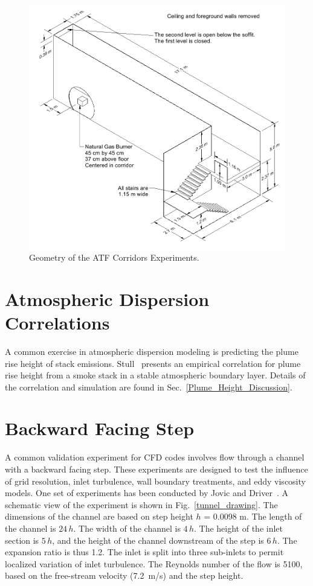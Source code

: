 \begin{figure}[p]
\includegraphics[width=\textwidth]{FIGURES/ATF_Corridors/ATF_Corridors_Drawing}
\caption{Geometry of the ATF Corridors Experiments.}
\label{ATF Drawing}
\end{figure}


\section{Atmospheric Dispersion Correlations}
\label{Atmospheric_Dispersion_Description}

A common exercise in atmospheric dispersion modeling is predicting the plume rise height of stack emissions. Stull~\cite{Stull:2000} presents an empirical correlation for plume rise height from a smoke stack in a stable atmospheric boundary layer. Details of the correlation and simulation are found in Sec.~\ref{Plume_Height_Discussion}.



\section{Backward Facing Step}
\label{Backward_Facing_Step_Description}

A common validation experiment for CFD codes involves flow through a channel with a backward facing step. These experiments are designed to test the influence of grid resolution, inlet turbulence, wall boundary treatments, and eddy viscosity models. One set of experiments has been conducted by Jovic and Driver~\cite{JD:1994}.  A schematic view of the experiment is shown in Fig.~\ref{tunnel_drawing}. The dimensions of the channel are based on step height $h$ = 0.0098 m.  The length of the channel is $24 \, h$. The width of the channel is $4 \, h$. The height of the inlet section is $5 \, h$, and the height of the channel downstream of the step is $6 \, h$. The expansion ratio is thus 1.2.  The inlet is split into three sub-inlets to permit localized variation of inlet turbulence.  The Reynolds number of the flow is 5100, based on the free-stream velocity (7.2~m/s) and the step height.

